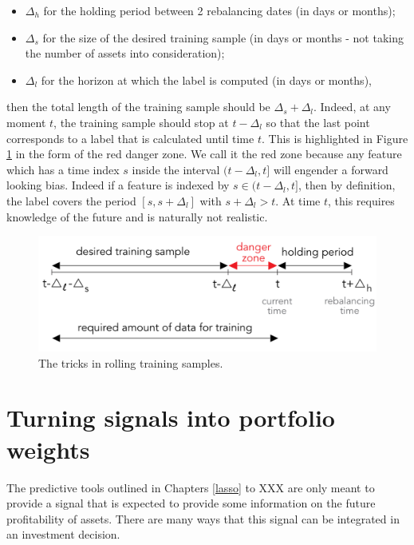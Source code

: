 \documentclass[]{krantz}
\providecommand{\tightlist}{%
  \setlength{\itemsep}{0pt}\setlength{\parskip}{0pt}}
\theoremstyle{definition}
\theoremstyle{definition}
\theoremstyle{definition}
\theoremstyle{remark}
\begin{document}
\begin{itemize}
\tightlist
\item
  \(\Delta_h\) for the holding period between 2 rebalancing dates (in
  days or months);
\item
  \(\Delta_s\) for the size of the desired training sample (in days or
  months - not taking the number of assets into consideration);
\item
  \(\Delta_l\) for the horizon at which the label is computed (in days
  or months),
\end{itemize}

then the total length of the training sample should be
\(\Delta_s+\Delta_l\). Indeed, at any moment \(t\), the training sample
should stop at \(t-\Delta_l\) so that the last point corresponds to a
label that is calculated until time \(t\). This is highlighted in Figure
\ref{fig:backtestoos2} in the form of the red danger zone. We call it
the red zone because any feature which has a time index \(s\) inside the
interval \((t-\Delta_l,t]\) will engender a forward looking bias. Indeed
if a feature is indexed by \(s \in (t-\Delta_l,t]\), then by definition,
the label covers the period \([s,s+\Delta_l]\) with \(s+\Delta_l>t\). At
time \(t\), this requires knowledge of the future and is naturally not
realistic.

\begin{figure}[H]

{\centering \includegraphics[width=450px]{images/backtestoos2} 

}

\caption{The tricks in rolling training samples.}\label{fig:backtestoos2}
\end{figure}

\hypertarget{turning-signals-into-portfolio-weights}{%
\section{Turning signals into portfolio
weights}\label{turning-signals-into-portfolio-weights}}

The predictive tools outlined in Chapters \ref{lasso} to XXX are only
meant to provide a signal that is expected to provide some information
on the future profitability of assets. There are many ways that this
signal can be integrated in an investment decision.
\end{document}
